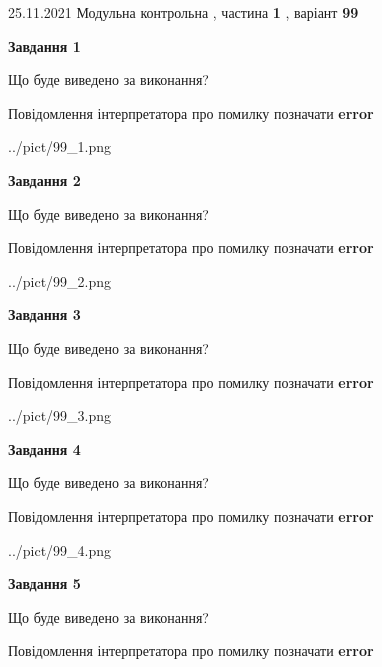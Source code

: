 \documentclass[10pt, ukrainian]{article}
\begin{document}
{25.11.2021 Модульна контрольна , частина \textbf { 1 }, варіант  \No \textbf { 99 }\par}
{
\begin {large}

{\begin {center}\textbf{Завдання 1}\end {center}}\par
Що буде виведено за виконання? \par
Повідомлення інтерпретатора про помилку позначати \textbf{error}

\begin{center}
	{../pict/99_1.png}
\end{center}
\newpage

{\begin {center}\textbf{Завдання 2}\end {center}}\par
Що буде виведено за виконання? \par
Повідомлення інтерпретатора про помилку позначати \textbf{error}

\begin{center}
	{../pict/99_2.png}
\end{center}
\newpage

{\begin {center}\textbf{Завдання 3}\end {center}}\par
Що буде виведено за виконання? \par
Повідомлення інтерпретатора про помилку позначати \textbf{error}

\begin{center}
	{../pict/99_3.png}
\end{center}
\newpage

{\begin {center}\textbf{Завдання 4}\end {center}}\par
Що буде виведено за виконання? \par
Повідомлення інтерпретатора про помилку позначати \textbf{error}

\begin{center}
	{../pict/99_4.png}
\end{center}
\newpage

{\begin {center}\textbf{Завдання 5}\end {center}}\par
Що буде виведено за виконання? \par
Повідомлення інтерпретатора про помилку позначати \textbf{error}


\end{large}}
\end{document}
